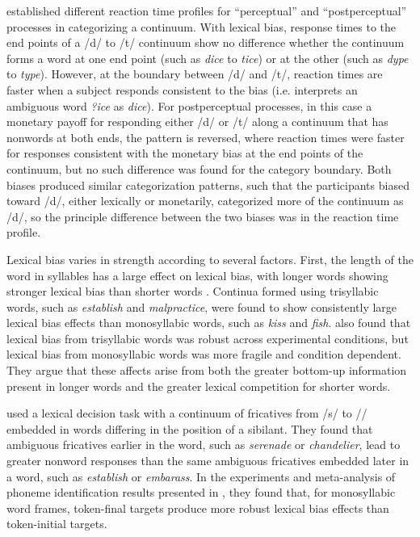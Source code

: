 \citet{Connine1987a} established different reaction time profiles for ``perceptual'' and ``postperceptual'' processes in categorizing a continuum.  With lexical bias, response times to the end points of a /d/ to /t/ continuum show no difference whether the continuum forms a word at one end point (such as \emph{dice} to \emph{tice}) or at the other (such as \emph{dype} to \emph{type}).  However, at the boundary between /d/ and /t/, reaction times are faster when a subject responds consistent to the bias (i.e. interprets an ambiguous word \emph{?ice} as \emph{dice}).  For postperceptual processes, in this case a monetary payoff for responding either /d/ or /t/ along a continuum that has nonwords at both ends, the pattern is reversed, where reaction times were faster for responses consistent with the monetary bias at the end points of the continuum, but no such difference was found for the category boundary.  Both biases produced similar categorization patterns, such that the participants biased toward /d/, either lexically or monetarily, categorized more of the continuum as /d/, so the principle difference between the two biases was in the reaction time profile.

Lexical bias varies in strength according to several factors.  
First, the length of the word in syllables has a large effect on lexical bias, with longer words showing stronger lexical bias than shorter words \citep{Pitt2006}.  
Continua formed using trisyllabic words, such as \emph{establish} and \emph{malpractice}, were found to show consistently large lexical bias effects than monosyllabic words, such as \emph{kiss} and \emph{fish}.  
\citet{Pitt2006} also found that lexical bias from trisyllabic words was robust across experimental conditions, but lexical bias from monosyllabic words was more fragile and condition dependent.  
They argue that these affects arise from both the greater bottom-up information present in longer words and the greater lexical competition for shorter words.

\citet{Pitt2012} used a lexical decision task with a continuum of fricatives from /s/ to /\textesh/ embedded in words differing in the position of a sibilant.  
They found that ambiguous fricatives earlier in the word, such as \emph{serenade} or \emph{chandelier}, lead to greater nonword responses than the same ambiguous fricatives embedded later in a word, such as \emph{establish} or \emph{embarass}.  
In the experiments and meta-analysis of phoneme identification results presented in \citet{Pitt1993}, they found that, for monosyllabic word frames, token-final targets produce more robust lexical bias effects than token-initial targets.

